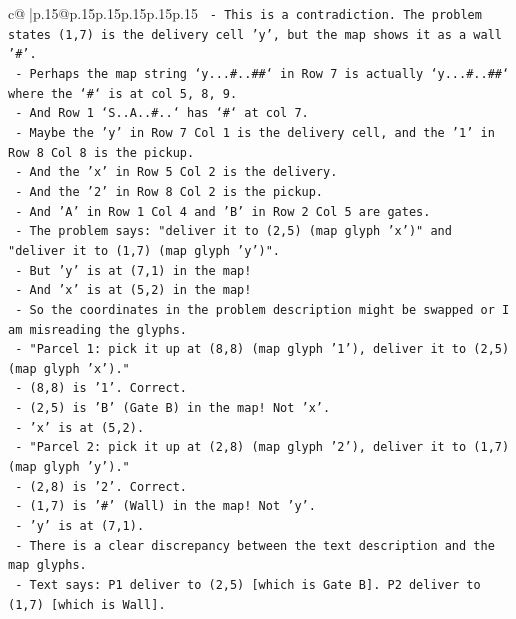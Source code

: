 \documentclass{article}
\begin{document}
{\begin{supertabular}{c@{$\;$}|p{.15\linewidth}@{}p{.15\linewidth}p{.15\linewidth}p{.15\linewidth}p{.15\linewidth}p{.15\linewidth}}
{{{\texttt{       {-} This is a contradiction. The problem states (1,7) is the delivery cell 'y', but the map shows it as a wall '\#'.} \\
\texttt{       {-} Perhaps the map string `y...\#..\#\#` in Row 7 is actually `y...\#..\#\#` where the `\#` is at col 5, 8, 9.} \\
\texttt{       {-} And Row 1 `S..A..\#..` has `\#` at col 7.} \\
\texttt{       {-} Maybe the 'y' in Row 7 Col 1 is the delivery cell, and the '1' in Row 8 Col 8 is the pickup.} \\
\texttt{       {-} And the 'x' in Row 5 Col 2 is the delivery.} \\
\texttt{       {-} And the '2' in Row 8 Col 2 is the pickup.} \\
\texttt{       {-} And 'A' in Row 1 Col 4 and 'B' in Row 2 Col 5 are gates.} \\
\texttt{       {-} The problem says: "deliver it to (2,5) (map glyph 'x')" and "deliver it to (1,7) (map glyph 'y')".} \\
\texttt{       {-} But 'y' is at (7,1) in the map!} \\
\texttt{       {-} And 'x' is at (5,2) in the map!} \\
\texttt{       {-} So the coordinates in the problem description might be swapped or I am misreading the glyphs.} \\
\texttt{       {-} "Parcel 1: pick it up at (8,8) (map glyph '1'), deliver it to (2,5) (map glyph 'x')."} \\
\texttt{         {-} (8,8) is '1'. Correct.} \\
\texttt{         {-} (2,5) is 'B' (Gate B) in the map! Not 'x'.} \\
\texttt{         {-} 'x' is at (5,2).} \\
\texttt{       {-} "Parcel 2: pick it up at (2,8) (map glyph '2'), deliver it to (1,7) (map glyph 'y')."} \\
\texttt{         {-} (2,8) is '2'. Correct.} \\
\texttt{         {-} (1,7) is '\#' (Wall) in the map! Not 'y'.} \\
\texttt{         {-} 'y' is at (7,1).} \\
\texttt{       {-} There is a clear discrepancy between the text description and the map glyphs.} \\
\texttt{       {-} Text says: P1 deliver to (2,5) {[}which is Gate B{]}. P2 deliver to (1,7) {[}which is Wall{]}.} \\
}}}
\end{supertabular}}
\end{document}
